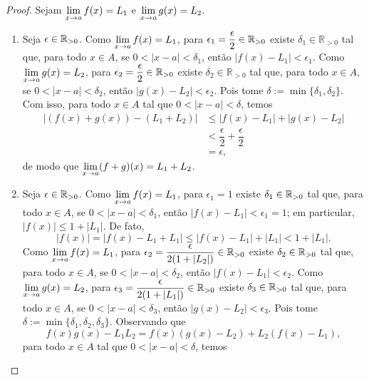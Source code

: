 \begin{proof}
    Sejam $\displaystyle \lim_{x \to a} f(x) = L_1$ e $\displaystyle \lim_{x \to a} g(x) = L_2$.
        \begin{enumerate}[leftmargin=*, align=left, label=\textbf{(\alph*)}]
            \item Seja $\epsilon \in \mathbb{R}_{>0}$. Como $\displaystyle \lim_{x \to a} f(x) = L_1$, para $\displaystyle \epsilon_1 = \dfrac{\epsilon}{2} \in \mathbb{R}_{>0}$ existe $\delta_1 \in \mathbb{R}_{>0}$ tal que, para todo $x \in A$, se $0<|x-a|<\delta_1$, então $|f(x) - L_1| < \epsilon_1$. Como $\displaystyle \lim_{x \to a} g(x) = L_2$, para $\displaystyle \epsilon_2 = \dfrac{\epsilon}{2} \in \mathbb{R}_{>0}$ existe $\delta_2 \in \mathbb{R}_{>0}$ tal que, para todo $x \in A$, se $0<|x-a|<\delta_2$, então $|g(x) - L_2| < \epsilon_2$. Pois tome $\delta := \min \{\delta_1, \delta_2 \}$. Com isso, para todo $x \in A$ tal que $0 < |x-a| < \delta$, temos
                \begin{align*}
                    |(f(x) + g(x)) - (L_1 + L_2)|
                        &\leq |f(x) - L_1| + |g(x) - L_2| \\
                        &< \dfrac{\epsilon}{2} + \dfrac{\epsilon}{2} \\
                        &= \epsilon,
                \end{align*}
            de modo que $\displaystyle \lim_{x \to a} (f+g)(x) = L_1 + L_2$. \blackproof
            \item {}
            Seja $\epsilon \in \mathbb{R}_{>0}$. Como $\displaystyle \lim_{x \to a} f(x) = L_1$, para $\epsilon_1 = 1$ existe $\delta_1 \in \mathbb{R}_{>0}$ tal que, para todo $x \in A$, se $0<|x-a|<\delta_1$, então $|f(x) - L_1| < \epsilon_1 = 1$; em particular, $|f(x)| \leq 1 + |L_1|$. De fato, 
                \[
                    |f(x)| = |f(x) - L_1 + L_1| \leq |f(x) - L_1| + |L_1| < 1 + |L_1|.
                \]
            Como $\displaystyle \lim_{x \to a} f(x) = L_1$, para $\displaystyle \epsilon_2 = \dfrac{\epsilon}{2(1 + |L_2|)} \in \mathbb{R}_{>0}$ existe $\delta_2 \in \mathbb{R}_{>0}$ tal que, para todo $x \in A$, se $0<|x-a|<\delta_2$, então $|f(x) - L_1| < \epsilon_2$. Como $\displaystyle \lim_{x \to a} g(x) = L_2$, para $\epsilon_3 = \dfrac{\epsilon}{2(1 + |L_1|)} \in \mathbb{R}_{>0}$ existe $\delta_3 \in \mathbb{R}_{>0}$ tal que, para todo $x \in A$, se $0<|x-a|<\delta_3$, então $|g(x) - L_2| < \epsilon_3$. Pois tome $\delta := \min \{\delta_1, \delta_2, \delta_3 \}$. Observando que
                \[
                    f(x) g(x) - L_1 L_2 = f(x) (g(x) - L_2) + L_2 (f(x) - L_1),
                \]
            para todo $x \in A$ tal que $0 < |x-a| < \delta$, temos

\end{enumerate}
\end{proof}
